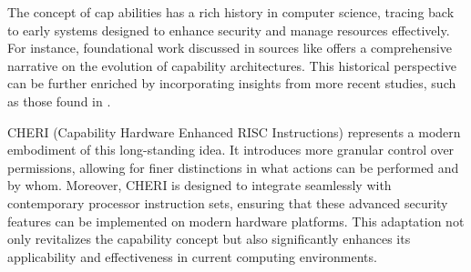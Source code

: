 The concept of cap  abilities has a rich history in computer science, tracing 
back to early systems designed to enhance security and manage resources effectively.
For instance, foundational work discussed in sources like \cite{noauthor_capability-based_nodate} offers a comprehensive 
narrative on the evolution of capability architectures. This historical perspective 
can be further enriched by incorporating insights from more recent studies, 
such as those found in \cite{miller_towards_nodate}.

CHERI (Capability Hardware Enhanced RISC Instructions)\cite{woodruff_cheri_2019} represents a modern embodiment of this 
long-standing idea. It introduces more granular control over permissions, allowing for finer 
distinctions in what actions can be performed and by whom. Moreover, CHERI is designed to integrate 
seamlessly with contemporary processor instruction sets, ensuring that these advanced security 
features can be implemented on modern hardware platforms. This adaptation not only revitalizes 
the capability concept but also significantly enhances its applicability and effectiveness 
in current computing environments.